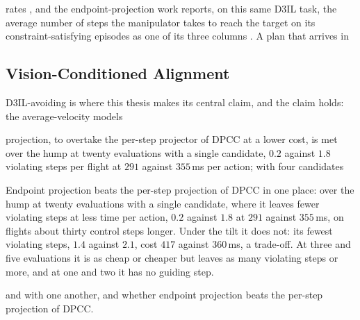 
rates \parencite[Sec.~6.1]{romer2025diffusion}, and the endpoint-projection work reports, on this same
D3IL task, the average number of steps the manipulator takes to reach the target on its constraint-satisfying
episodes as one of its three columns \parencite[Sec.~VII-A]{li2025hardflow}. A plan that arrives in

\subsection{Vision-Conditioned Alignment}\label{sec:setup:metrics:aligning}

D3IL-avoiding is where this thesis makes its central claim, and the claim holds: the average-velocity models

projection, to overtake the per-step projector of \ac{DPCC} at a lower cost, is met over the hump at twenty
evaluations with a single candidate, $0.2$ against $1.8$ violating steps per flight at $291$ against
$355$\,ms per action; with four candidates

Endpoint projection beats the per-step projection of \ac{DPCC} in one place: over the hump at twenty
evaluations with a single candidate, where it leaves fewer violating steps at less time per action, $0.2$
against $1.8$ at $291$ against $355$\,ms, on flights about thirty control steps longer. Under the tilt it
does not: its fewest violating steps, $1.4$ against $2.1$, cost $417$ against $360$\,ms, a trade-off. At
three and five evaluations it is as cheap or cheaper but leaves as many violating steps or more, and at one
and two it has no guiding step.

and with one another, and whether endpoint projection beats the per-step projection of \ac{DPCC}.

